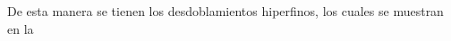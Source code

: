 \documentclass[../Main.tex]{subfiles}
\begin{document}
\noindent
De esta manera se tienen los desdoblamientos hiperfinos, los cuales se muestran en la 
\end{document}
